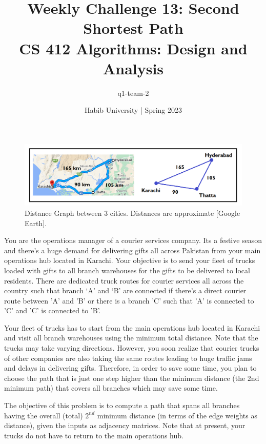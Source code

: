 \documentclass[a4paper]{exam}
\title{Weekly Challenge 13: Second Shortest Path\\CS 412 Algorithms: Design and Analysis}
\author{q1-team-2}  %
\date{Habib University | Spring 2023}
\begin{document}
\maketitle

\begin{questions}


	\begin{figure}[!h]
		\centering
		\includegraphics[width=.95\textwidth]{karachi-hyderabad-thatta.png}

		\caption{Distance Graph between 3 cities. Distances are approximate [Google Earth].}
		\label{fig:notation}
	\end{figure}

	You are the operations manager of a courier services company. Its a festive season and there's a huge demand for delivering gifts all across Pakistan from your main operations hub located in Karachi. Your objective is to send your fleet of trucks loaded with gifts to all branch warehouses for the gifts to be delivered to local residents. There are dedicated truck routes for courier services all across the country such that branch `A' and `B' are connected if there's a direct courier route between 'A' and 'B' or there is a branch 'C' such that 'A' is connected to 'C' and 'C' is connected to 'B'.

	Your fleet of trucks has to start from the main operations hub located in Karachi and visit all branch warehouses using the minimum total distance. Note that the trucks may take varying directions.  However, you soon realize that courier trucks of other companies are also taking the same routes leading to huge traffic jams and delays in delivering gifts. Therefore, in order to save some time, you plan to choose the path that is just one step higher than the minimum distance (the 2nd minimum path) that covers all branches which may save some time.

	The objective of this problem is to compute a path that spans all branches having the overall (total) $2^{nd}$ minimum distance (in terms of the edge weights as distance), given the inputs as adjacency matrices. Note that at present, your trucks do not have to return to the main operations hub.


\end{questions}
\end{document}

